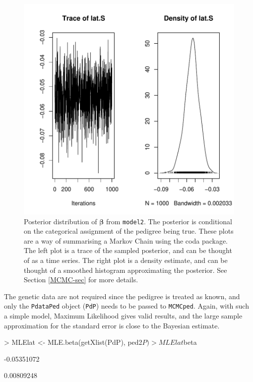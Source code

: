 \documentclass{article}
\begin{document}
\begin{figure}[!h]
\begin{center}
\includegraphics{Tutorial-023}
\end{center}
\caption{Posterior distribution of $\bm{\beta}$ from \texttt{model2}. The posterior is conditional on the categorical assignment of the pedigree being true. These plots are a way of summarising a Markov Chain using the coda package.  The left plot is a trace of the sampled posterior, and can be thought of as a time series.  The right plot is a density estimate, and can be thought of a smoothed histogram approximating the posterior.  See Section \ref{MCMC-sec} for more details.}
\label{model2beta}
\end{figure}

The genetic data are not required since the pedigree is treated as known, and only the \texttt{PdataPed} object (\texttt{PdP}) needs to be passed to \texttt{MCMCped}.  Again, with such a simple model, Maximum Likelihood gives valid results, and the large sample approximation for the standard error is close to the Bayesian estimate. 


\begin{Schunk}
\begin{Sinput}
> MLElat <- MLE.beta(getXlist(PdP), ped2$P)
> MLElat$beta
\end{Sinput}
\begin{Soutput}
            [,1]
[1,] -0.05351072
\end{Soutput}
\begin{Soutput}
           [,1]
[1,] 0.00809248
\end{Soutput}
\end{Schunk}
\end{document}
